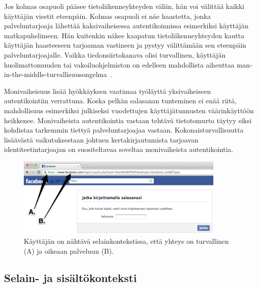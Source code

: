 \documentclass[finnish,gradu]{tktltiki}
\begin{document}
  Jos kolmas osapuoli pääsee tietoliikenneyhteyden väliin, hän voi välittää kaikki käyttäjän viestit eteenpäin. Kolmas osapuoli ei näe haastetta, jonka palveluntarjoaja lähettää kaksivaiheisessa autentikoinnissa esimerkiksi käyttäjän matkapuhelimeen. Hän kuitenkin näkee kaapatun tietoliikenneyhteyden kautta käyttäjän haasteeseen tarjoaman vastineen ja pystyy välittämään sen eteenpäin palveluntarjoajalle. Vaikka tiedonsiirtokanava olisi turvallinen, käyttäjän huolimattomuuden tai vakoiluohjelmiston on edelleen mahdollista aiheuttaa man-in-the-middle-tur\-val\-li\-suusongelma~\cite{schneier_2factor_2012}.

  Monivaiheisuus lisää hyökkäyksen vaatimaa työläyttä yksivaiheiseen autentikointiin verrattuna. Koska pelkän salasanan tunteminen ei enää riitä, mahdollisuus esimerkiksi julkiseksi vuodettujen käyttäjätunnusten väärinkäyttöön heikkenee. Monivaiheista autentikointia vastaan tehtävä tietotomurto täytyy siksi kohdistaa tarkemmin tiettyä palveluntarjoajaa vastaan. Kokonaisturvallisuutta lisäävästä vaikutuksestaan johtuen kertakirjautumista tarjoavan identiteetintarjoajan on suositeltavaa soveltaa monivaiheista autentikointia.






  \begin{figure}
    \centering
    \includegraphics[width=0.9\textwidth]{images/Facebook_reauth_ab.jpg}
    \caption[Selainkontekstin esittely.]{Käyttäjän on nähtävä selainkontekstissa, että yhteys on turvallinen (A) ja oikeaan palveluun (B).}
    \label{fig:facebook_reauth_ab}
  \end{figure}

  \subsection{Selain- ja sisältökonteksti} %
  \label{sub:selainkonteksti_vs_applikaatiokonteksti}
\end{document}
